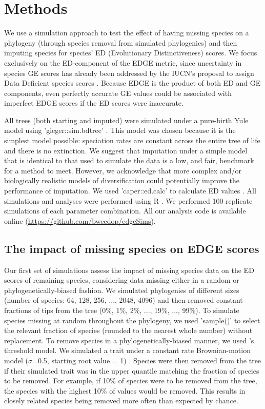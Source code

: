 \documentclass[10pt,english]{article}
\begin{document}
\section*{Methods}

We use a simulation approach to test the effect of having missing species
on a phylogeny (through species removal from simulated phylogenies) and then
imputing species for species’ ED (Evolutionary Distinctiveness) scores. We focus
exclusively on the ED-component of the EDGE metric, since uncertainty in species
GE scores has already been addressed by the IUCN’s proposal to assign Data
Deficient species scores \autocite{Iucn2001, Iucn2008}. Because EDGE is the
product of both ED and GE components, even perfectly accurate GE values could be
associated with imperfect EDGE scores if the ED scores were inaccurate.

All trees (both starting and imputed) were simulated under a pure-birth Yule
model using 'gieger::sim.bdtree' \autocite[setting parameters \texttt{b=1} and
\texttt{d=0};][]{Pennell2014}. This model was chosen because it is the simplest
model possible: speciation rates are constant across the entire tree of life and
there is no extinction. We suggest that imputation under a simple model that is
identical to that used to simulate the data is a low, and fair, benchmark for a
method to meet. However, we acknowledge that more complex and/or biologically
realistic models of diversification could potentially improve the performance of
imputation. We used 'caper::ed.calc' to calculate ED values \autocite{Orme2013}.
All simulations and analyses were performed using R \autocite[version
3.4.0;][]{R2017}. We performed 100 replicate simulations of each parameter
combination. All our analysis code is available online
(\url{https://github.com/bweedop/edgeSims}).

\subsection*{The impact of missing species on EDGE scores}
Our first set of simulations assess the impact of missing species data on the ED
scores of remaining species, considering data missing either in a random or
phylogenetically-biased fashion. We simulated phylogenies of different sizes
(number of species: 64, 128, 256, ..., 2048, 4096) and then removed constant
fractions of tips from the tree (0\%, 1\%, 2\%, ..., 19\%, ..., 99\%). To
simulate species missing at random throughout the phylogeny, we used 'sample()'
to select the relevant fraction of species (rounded to the nearest whole number)
without replacement. To remove species in a phylogenetically-biased manner, we
used \textcite{Felsenstein2005}'s threshold model. We simulated a trait under a
constant rate Brownian-motion model ($\sigma$=0.5, starting root value = 1)
\autocite[using 'geiger::sim.char'][]{Pennell2014}. Species were then removed
from the tree if their simulated trait was in the upper quantile matching the
fraction of species to be removed. For example, if 10\% of species were to be
removed from the tree, the species with the highest 10\% of values would be
removed. This results in closely related species being removed more often than
expected by chance.
\end{document}
